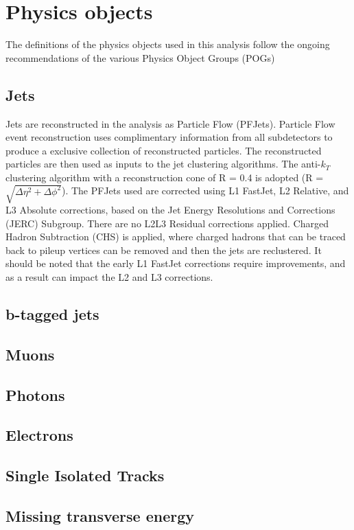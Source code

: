 \section{Physics objects}
\label{sec:objects}
The definitions of the physics objects used in this analysis follow the ongoing recommendations of the various Physics Object Groups (POGs)
\subsection{Jets}
Jets are reconstructed in the analysis as Particle Flow (PFJets). Particle Flow event reconstruction uses complimentary information from all subdetectors to produce a exclusive collection of reconstructed particles. The reconstructed particles are then used as inputs to the jet clustering algorithms. The anti-$k_{T}$ clustering algorithm with a reconstruction cone of R = 0.4 is adopted (R = $\sqrt{\Delta \eta^{2} + \Delta \phi^{2}   }$). The PFJets used are corrected using L1 FastJet, L2 Relative, and L3 Absolute corrections, based on the Jet Energy Resolutions and Corrections (JERC) Subgroup. There are no L2L3 Residual corrections applied. Charged Hadron Subtraction (CHS) is applied, where charged hadrons that can be traced back to pileup vertices can be removed and then the jets are reclustered. 
It should be noted that the early L1 FastJet corrections require improvements, and as a result can impact the L2 and L3 corrections. 

\subsection{b-tagged jets}


\subsection{Muons}

\subsection{Photons}

\subsection{Electrons}

\subsection{Single Isolated Tracks}

\subsection{Missing transverse energy}


